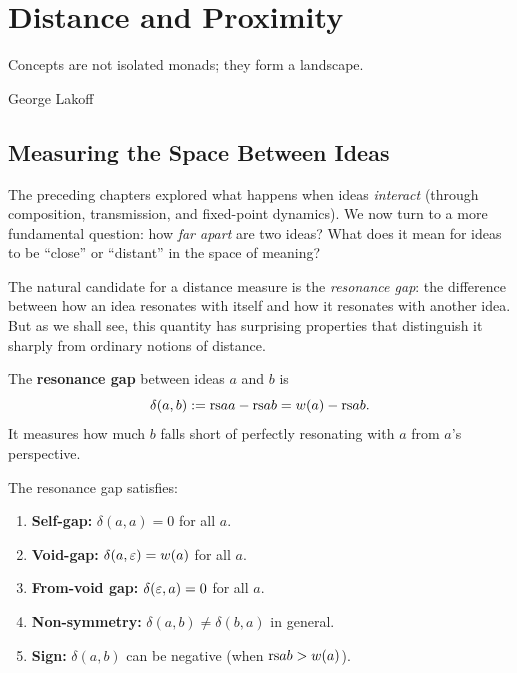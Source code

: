 \chapter{Distance and Proximity}
\label{ch:distance}

\epigraph{Concepts are not isolated monads; they form a landscape.}{George Lakoff}

\section{Measuring the Space Between Ideas}

The preceding chapters explored what happens when ideas \emph{interact}
(through composition, transmission, and fixed-point dynamics).  We now turn
to a more fundamental question: how \emph{far apart} are two ideas?  What does
it mean for ideas to be ``close'' or ``distant'' in the space of meaning?

The natural candidate for a distance measure is the \emph{resonance gap}:
the difference between how an idea resonates with itself and how it resonates
with another idea.  But as we shall see, this quantity has surprising properties
that distinguish it sharply from ordinary notions of distance.

\begin{definition}
\label{def:gap}
The \textbf{resonance gap} between ideas $a$ and $b$ is
\[
  \delta(a, b) := \mathrm{rs}{a}{a} - \mathrm{rs}{a}{b} = w(a) - \mathrm{rs}{a}{b}.
\]
It measures how much $b$ falls short of perfectly resonating with $a$
from $a$'s perspective.
\end{definition}

\begin{theorem}
\label{thm:gap-properties}
The resonance gap satisfies:
\begin{enumerate}
\item \textbf{Self-gap:} $\delta(a, a) = 0$ for all $a$.
\item \textbf{Void-gap:} $\delta(a, \varepsilon) = w(a)$ for all $a$.
\item \textbf{From-void gap:} $\delta(\varepsilon, a) = 0$ for all $a$.
\item \textbf{Non-symmetry:} $\delta(a, b) \neq \delta(b, a)$ in general.
\item \textbf{Sign:} $\delta(a, b)$ can be negative (when $\mathrm{rs}{a}{b} > w(a)$).
\end{enumerate}
\end{theorem}

